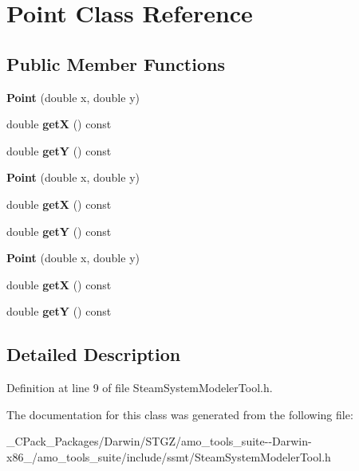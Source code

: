 \hypertarget{class_point}{}\section{Point Class Reference}
\label{class_point}
\subsection*{Public Member Functions}
\begin{DoxyCompactItemize}
\item 
\mbox{\label{class_point_a78b55e8d5466bb8c2cf60fa55f2562ff}} 
{\bfseries Point} (double x, double y)
\item 
\mbox{\label{class_point_a655794dd595a4821987664bf1d9010e8}} 
double {\bfseries getX} () const
\item 
\mbox{\label{class_point_aa323a12bec85e28ce6575dccec4f8b28}} 
double {\bfseries getY} () const
\item 
\mbox{\label{class_point_a78b55e8d5466bb8c2cf60fa55f2562ff}} 
{\bfseries Point} (double x, double y)
\item 
\mbox{\label{class_point_a655794dd595a4821987664bf1d9010e8}} 
double {\bfseries getX} () const
\item 
\mbox{\label{class_point_aa323a12bec85e28ce6575dccec4f8b28}} 
double {\bfseries getY} () const
\item 
\mbox{\label{class_point_a78b55e8d5466bb8c2cf60fa55f2562ff}} 
{\bfseries Point} (double x, double y)
\item 
\mbox{\label{class_point_a655794dd595a4821987664bf1d9010e8}} 
double {\bfseries getX} () const
\item 
\mbox{\label{class_point_aa323a12bec85e28ce6575dccec4f8b28}} 
double {\bfseries getY} () const
\end{DoxyCompactItemize}


\subsection{Detailed Description}


Definition at line 9 of file Steam\+System\+Modeler\+Tool.\+h.



The documentation for this class was generated from the following file\+:\begin{DoxyCompactItemize}
\item 
\+\_\+\+C\+Pack\+\_\+\+Packages/\+Darwin/\+S\+T\+G\+Z/amo\+\_\+tools\+\_\+suite-\/-\/\+Darwin-\/x86\+\_/amo\+\_\+tools\+\_\+suite/include/ssmt/Steam\+System\+Modeler\+Tool.\+h\end{DoxyCompactItemize}
